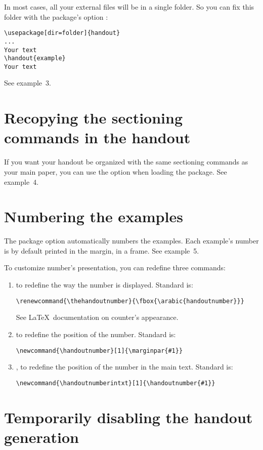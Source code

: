 \documentclass{ltxdockit}[2011/03/25]
\begin{document}
In most cases, all your external files will be in a single folder. So you can fix this folder with the package's option :
\begin{verbatim}
\usepackage[dir=folder]{handout}
...
Your text
\handout{example}
Your text
\end{verbatim}

See example~3.

\section{Recopying the sectioning commands in the handout}

If you want your handout be organized with the same sectioning commands as your main paper, you can use the option  when loading the package. See example~4.

\section{Numbering the examples}

The package option  automatically numbers the examples. Each example's number is by default printed in the margin, in a frame. See example~5.

To customize number's presentation, you can redefine three commands:
\begin{enumerate}  
  \item {} to redefine the way the number is displayed. Standard is:
\begin{verbatim}
\renewcommand{\thehandoutnumber}{\fbox{\arabic{handoutnumber}}}
\end{verbatim}  
See \LaTeX\ documentation on counter's appearance. 
  \item {} to redefine the position of the number. Standard is:
\begin{verbatim}
\newcommand{\handoutnumber}[1]{\marginpar{#1}}
\end{verbatim}
  \item {}, to redefine the position of the number in the main text. Standard is:
\begin{verbatim}
\newcommand{\handoutnumberintxt}[1]{\handoutnumber{#1}}
\end{verbatim}
\end{enumerate}

\section{Temporarily disabling the handout generation}
\end{document}

